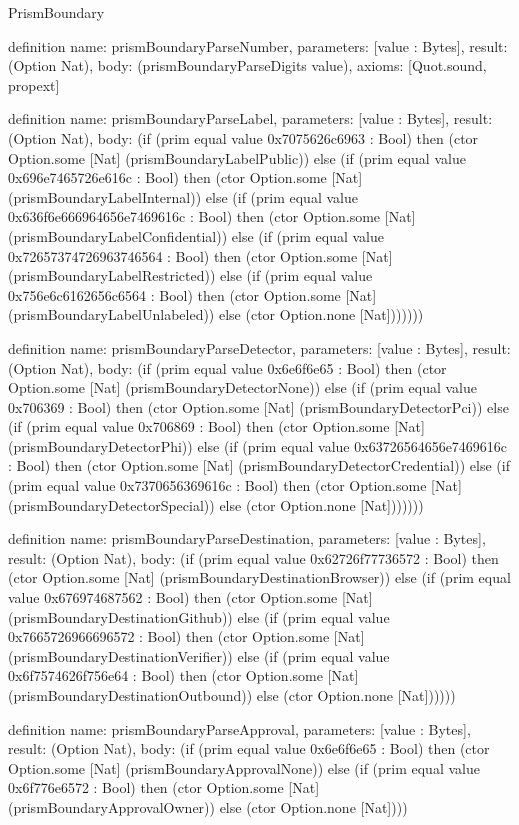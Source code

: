 \begin{lexlean}{PrismBoundary}
\begin{semanticmodule}
definition{
  name: prismBoundaryParseNumber,
  parameters: [value : Bytes],
  result: (Option Nat),
  body: (prismBoundaryParseDigits value),
  axioms: [Quot.sound, propext]
}

definition{
  name: prismBoundaryParseLabel,
  parameters: [value : Bytes],
  result: (Option Nat),
  body: (if (prim equal value 0x7075626c6963 : Bool) then (ctor Option.some [Nat] (prismBoundaryLabelPublic)) else (if (prim equal value 0x696e7465726e616c : Bool) then (ctor Option.some [Nat] (prismBoundaryLabelInternal)) else (if (prim equal value 0x636f6e666964656e7469616c : Bool) then (ctor Option.some [Nat] (prismBoundaryLabelConfidential)) else (if (prim equal value 0x72657374726963746564 : Bool) then (ctor Option.some [Nat] (prismBoundaryLabelRestricted)) else (if (prim equal value 0x756e6c6162656c6564 : Bool) then (ctor Option.some [Nat] (prismBoundaryLabelUnlabeled)) else (ctor Option.none [Nat]))))))
}

definition{
  name: prismBoundaryParseDetector,
  parameters: [value : Bytes],
  result: (Option Nat),
  body: (if (prim equal value 0x6e6f6e65 : Bool) then (ctor Option.some [Nat] (prismBoundaryDetectorNone)) else (if (prim equal value 0x706369 : Bool) then (ctor Option.some [Nat] (prismBoundaryDetectorPci)) else (if (prim equal value 0x706869 : Bool) then (ctor Option.some [Nat] (prismBoundaryDetectorPhi)) else (if (prim equal value 0x63726564656e7469616c : Bool) then (ctor Option.some [Nat] (prismBoundaryDetectorCredential)) else (if (prim equal value 0x7370656369616c : Bool) then (ctor Option.some [Nat] (prismBoundaryDetectorSpecial)) else (ctor Option.none [Nat]))))))
}

definition{
  name: prismBoundaryParseDestination,
  parameters: [value : Bytes],
  result: (Option Nat),
  body: (if (prim equal value 0x62726f77736572 : Bool) then (ctor Option.some [Nat] (prismBoundaryDestinationBrowser)) else (if (prim equal value 0x676974687562 : Bool) then (ctor Option.some [Nat] (prismBoundaryDestinationGithub)) else (if (prim equal value 0x7665726966696572 : Bool) then (ctor Option.some [Nat] (prismBoundaryDestinationVerifier)) else (if (prim equal value 0x6f7574626f756e64 : Bool) then (ctor Option.some [Nat] (prismBoundaryDestinationOutbound)) else (ctor Option.none [Nat])))))
}

definition{
  name: prismBoundaryParseApproval,
  parameters: [value : Bytes],
  result: (Option Nat),
  body: (if (prim equal value 0x6e6f6e65 : Bool) then (ctor Option.some [Nat] (prismBoundaryApprovalNone)) else (if (prim equal value 0x6f776e6572 : Bool) then (ctor Option.some [Nat] (prismBoundaryApprovalOwner)) else (ctor Option.none [Nat])))
}


\end{semanticmodule}
\end{lexlean}
